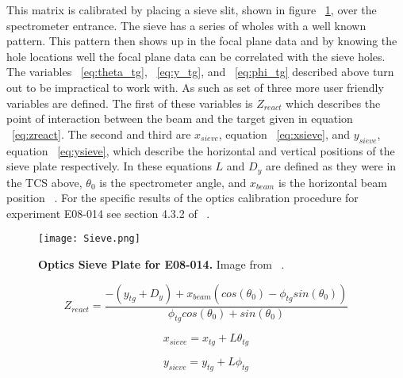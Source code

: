 This matrix is calibrated by placing a sieve slit, shown in figure ~\ref{fig:sieve}, over the spectrometer entrance. The sieve has a series of wholes with a well known pattern. This pattern then shows up in the focal plane data and by knowing the hole locations well the focal plane data can be correlated with the sieve holes.  The variables ~\ref{eq:theta_tg}, ~\ref{eq:y_tg}, and ~\ref{eq:phi_tg} described above turn out to be impractical to work with. As such as set of three more user friendly variables are defined. The first of these variables is $Z_{react}$ which describes the point of interaction between the beam and the target given in equation ~\ref{eq:zreact}. The second and third are $x_{sieve}$, equation ~\ref{eq:xsieve}, and $y_{sieve}$, equation ~\ref{eq:ysieve}, which describe the horizontal and vertical positions of the sieve plate respectively. In these equations $L$ and $D_y$ are defined as they were in the TCS above, $\theta_0$ is the spectrometer angle, and $x_{beam}$ is the horizontal beam position ~\cite{optics}. For the specific results of the optics calibration procedure for experiment E08-014 see section 4.3.2 of ~\cite{Thesis:Ye}.

\begin{figure}[!ht]
\begin{center}
\texttt{[image: Sieve.png]}
\end{center}
\caption{
{\bf{Optics Sieve Plate for E08-014.}} Image from ~\cite{Thesis:Ye}.}
\label{fig:sieve}
\end{figure}

\begin{equation} \label{eq:zreact}
	Z_{react} = \frac{-\left( y_{tg} + D_y \right) + x_{beam}\left( cos\left( \theta_0 \right) - \phi_{tg} sin\left( \theta_0 \right) \right)}{\phi_{tg} cos\left( \theta_0 \right) + sin\left( \theta_0 \right)}
\end{equation}

\begin{equation} \label{eq:xsieve}
	x_{sieve} = x_{tg} + L \theta_{tg}
\end{equation}

\begin{equation} \label{eq:ysieve}
	y_{sieve} = y_{tg} + L \phi_{tg}
\end{equation}